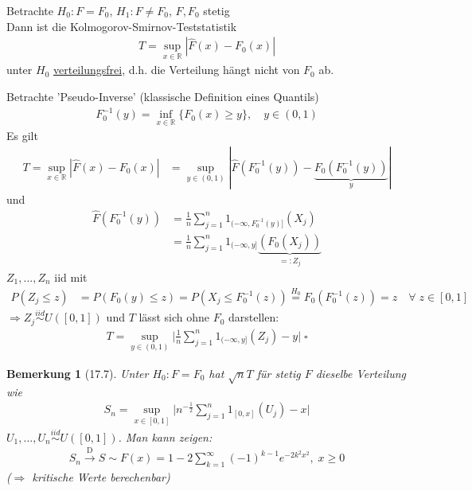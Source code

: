 \documentclass[a4paper,openany]{book}
\theoremstyle{mytheoremstyle}
\newtheorem*{bem}{Bemerkung}
\theoremstyle{mytheoremstyle2}
\newtheorem*{cbew}{Beweis}
\newenvironment{bew}[1][]{%
  \ifthenelse{\boolean{showbew}}{%
    \begin{cbew}[#1]%
  }{%
    \expandafter\comment%
  }%
}{%
  \ifthenelse{\boolean{showbew}}{%
    \end{cbew}%
  }{%
    \expandafter\endcomment%
  }%
}
\begin{document}
\begin{theo}{17.6}{}
  Betrachte $H_0:F=F_0 $, $H_1:F \neq F_0 $, $F,F_0 $ stetig \\
  Dann ist die Kolmogorov-Smirnov-Teststatistik
  \begin{align*}
    T=\sup _{x \in \mathbb{R}}|\hat{F}(x)-F_0(x)|
  \end{align*}
  unter $H_0 $ \underline{verteilungsfrei}, d.h. die Verteilung hängt nicht von $F_0 $ ab.
\end{theo}
\begin{bew}[]
  Betrachte 'Pseudo-Inverse' (klassische Definition eines Quantils) 
  \begin{align*}
    F_0 ^{-1}(y)=\inf _{x \in \mathbb{R}}\{F_0(x)\geq y\},\quad y \in (0,1)
  \end{align*}
  Es gilt 
  \begin{align*}
    T=\sup _{x \in \mathbb{R}}|\hat{F}(x)-F_0(x)|
    &=\sup _{y \in (0,1)}|\hat{F}(F_0 ^{-1}(y))-\underbrace{F_0(F_0 ^{-1}(y))}_{y}|
  \end{align*}
  und 
  \begin{align*}
    \hat{F}(F_0 ^{-1}(y)) 
    &=\frac{1}{n}\sum_{j=1}^{n}{1 _{(-\infty ,F_0 ^{-1}(y)]}}(X_j)\\
    &=\frac{1}{n}\sum_{j=1}^{n}{1 _{(-\infty ,y]}}\underbrace{(F_0(X_j))}_{=:Z_j}
  \end{align*}
  $Z_1,...,Z_n $ iid mit 
  \begin{align*}
    P(Z_j \leq z) &=P(F_0(y)\leq z)=P(X_j \leq F_0 ^{-1}(z))\overset{H_0}=F_0(F_0 ^{-1}(z))=z\quad \forall\;z \in [0,1]
  \end{align*}
  $\Rightarrow Z_j \overset{iid}\sim U([0,1]) $ und $T $ lässt sich ohne $F_0  $ darstellen:
  \begin{align*}
    T=\sup _{y \in (0,1)}\bigg|\frac{1}{n}\sum_{j=1}^{n}{1 _{(-\infty ,y]}(Z_j)-y}\bigg|\;\square
  \end{align*}
\end{bew}
\begin{bem}[17.7]
  Unter $H_0 :F=F_0$ hat $\sqrt{n}T $ für stetig $F $ dieselbe Verteilung wie 
  \begin{align*}
    S_n=\sup _{x \in [0,1]}\bigg|n ^{-\frac{1}{2}}\sum_{j=1}^{n}{1 _{[0,x]}(U_j)-x}\bigg|
  \end{align*}
  $U_1,...,U_n \overset{iid}\sim U([0,1])$. Man kann zeigen:
  \begin{align*}
    S_n \overset{\text{D}}\to S\sim F(x)=1-2 \sum_{k=1}^{\infty }{(-1)^{k-1}e^{-2k^2x^2}},\;x \geq 0
  \end{align*}
  ($\Rightarrow  $ kritische Werte berechenbar)
\end{bem}
\end{document}
